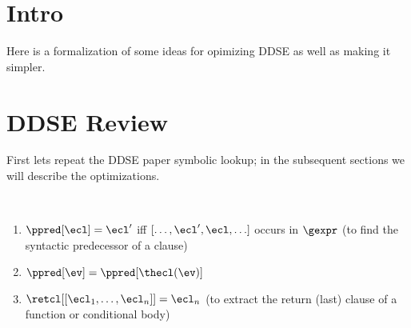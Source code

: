 \section{Intro}

Here is a formalization of some ideas for opimizing DDSE as well as making it simpler.

\section{DDSE Review}

First lets repeat the DDSE paper symbolic lookup; in the subsequent sections we will describe the optimizations.

\begin{definition}
  \label{def_clauseOps}
  \label{def_ppred} \label{def_ifx} \label{def_ifbranch} \label{def_retcl}
  \ \par
  \begin{enumerate}
      \item $\ppred[\ecl] = \ecl'$ iff $[\ldots,\ecl',\ecl,\ldots]$ occurs in $\gexpr$ \textnormal{(to find the syntactic predecessor of a clause)}
      \item $\ppred[\ev] = \ppred[{\thecl(\ev)}]$
      \item $\retcl[{[\ecl_1,\dots,\ecl_n]}] = \ecl_n$ \textnormal{(to extract the return (last) clause of a function or conditional body)}
   \end{enumerate}
\end{definition}



